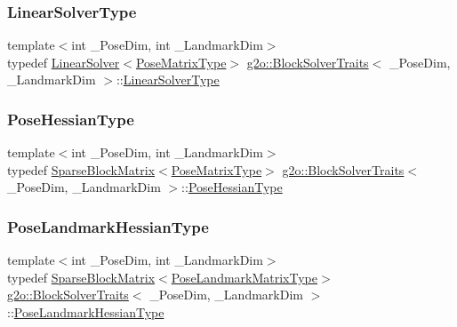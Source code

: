 \subsubsection{\texorpdfstring{Linear\+Solver\+Type}{LinearSolverType}}
{\footnotesize\ttfamily template$<$int \+\_\+\+Pose\+Dim, int \+\_\+\+Landmark\+Dim$>$ \\
typedef \mbox{\hyperlink{classg2o_1_1_linear_solver}{Linear\+Solver}}$<$\mbox{\hyperlink{structg2o_1_1_block_solver_traits_a35e6e4bad138dcfcaa3b1339e168bf30}{Pose\+Matrix\+Type}}$>$ \mbox{\hyperlink{structg2o_1_1_block_solver_traits}{g2o\+::\+Block\+Solver\+Traits}}$<$ \+\_\+\+Pose\+Dim, \+\_\+\+Landmark\+Dim $>$\+::\mbox{\hyperlink{structg2o_1_1_block_solver_traits_add6edae08cb0665c2b1e7c641cdb4dc4}{Linear\+Solver\+Type}}}

\mbox{\label{structg2o_1_1_block_solver_traits_a03351362339d8e6609c577123350bb2a}} 
\subsubsection{\texorpdfstring{Pose\+Hessian\+Type}{PoseHessianType}}
{\footnotesize\ttfamily template$<$int \+\_\+\+Pose\+Dim, int \+\_\+\+Landmark\+Dim$>$ \\
typedef \mbox{\hyperlink{classg2o_1_1_sparse_block_matrix}{Sparse\+Block\+Matrix}}$<$\mbox{\hyperlink{structg2o_1_1_block_solver_traits_a35e6e4bad138dcfcaa3b1339e168bf30}{Pose\+Matrix\+Type}}$>$ \mbox{\hyperlink{structg2o_1_1_block_solver_traits}{g2o\+::\+Block\+Solver\+Traits}}$<$ \+\_\+\+Pose\+Dim, \+\_\+\+Landmark\+Dim $>$\+::\mbox{\hyperlink{structg2o_1_1_block_solver_traits_a03351362339d8e6609c577123350bb2a}{Pose\+Hessian\+Type}}}

\mbox{\label{structg2o_1_1_block_solver_traits_af8ef27915a056caae3b12a9ca609eba6}} 
\subsubsection{\texorpdfstring{Pose\+Landmark\+Hessian\+Type}{PoseLandmarkHessianType}}
{\footnotesize\ttfamily template$<$int \+\_\+\+Pose\+Dim, int \+\_\+\+Landmark\+Dim$>$ \\
typedef \mbox{\hyperlink{classg2o_1_1_sparse_block_matrix}{Sparse\+Block\+Matrix}}$<$\mbox{\hyperlink{structg2o_1_1_block_solver_traits_a91e6510ad42179701d22c3ac312237cd}{Pose\+Landmark\+Matrix\+Type}}$>$ \mbox{\hyperlink{structg2o_1_1_block_solver_traits}{g2o\+::\+Block\+Solver\+Traits}}$<$ \+\_\+\+Pose\+Dim, \+\_\+\+Landmark\+Dim $>$\+::\mbox{\hyperlink{structg2o_1_1_block_solver_traits_af8ef27915a056caae3b12a9ca609eba6}{Pose\+Landmark\+Hessian\+Type}}}

